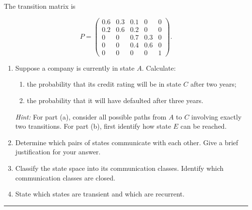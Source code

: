 \documentclass[
  letterpaper,
  DIV=11,
  numbers=noendperiod]{scrartcl}
\begin{document}
The transition matrix is

\[
P=
\begin{pmatrix}
0.6 & 0.3 & 0.1 & 0 & 0\\
0.2 & 0.6 & 0.2 & 0 & 0\\
0 & 0 & 0.7 & 0.3 & 0\\
0 & 0 & 0.4 & 0.6 & 0\\
0 & 0 & 0 & 0 & 1
\end{pmatrix}.
\]

\begin{enumerate}
\def\labelenumi{\arabic{enumi}.}
\item
  Suppose a company is currently in state \(A\). Calculate:

  \begin{enumerate}
  \def\labelenumii{\alph{enumii}.}
  \item
    the probability that its credit rating will be in state \(C\) after
    two years;
  \item
    the probability that it will have defaulted after three years.
  \end{enumerate}

  \emph{Hint:} For part (a), consider all possible paths from \(A\) to
  \(C\) involving exactly two transitions. For part (b), first identify
  how state \(E\) can be reached.
\item
  Determine which pairs of states communicate with each other. Give a
  brief justification for your answer.
\item
  Classify the state space into its communication classes. Identify
  which communication classes are closed.
\item
  State which states are transient and which are recurrent.
\end{enumerate}

\begin{center}\rule{0.5\linewidth}{0.5pt}\end{center}
\end{document}
